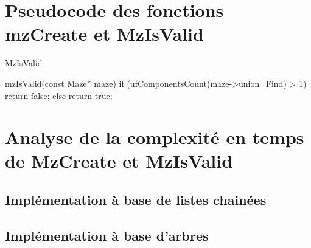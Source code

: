 \documentclass[11pt]{article}
\begin{document}
 

\section{Pseudocode des fonctions mzCreate et MzIsValid}
\begin{algorithm}
\caption{MzIsValid}
\begin{algorithmic}[1]
\bool mzIsValid(const Maze* maze)
{
    if (ufComponentsCount(maze->union_Find) > 1)
        return false;
    else return true;
}
\end {algorithmic}
\end{algorithm}

\section{Analyse de la complexité en temps de MzCreate et MzIsValid}

\subsection{Implémentation à base de listes chainées}

\subsection{Implémentation à base d'arbres}
\end{document}
